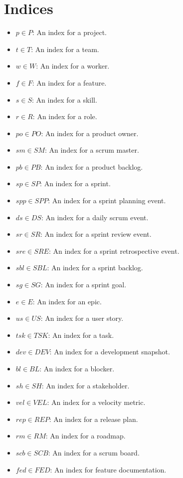 \documentclass{article}
\begin{document}
\section{Indices}
\begin{itemize}
    \item $p \in P$: An index for a project.
    \item $t \in T$: An index for a team.
    \item $w \in W$: An index for a worker.
    \item $f \in F$: An index for a feature.
    \item $s \in S$: An index for a skill.
    \item $r \in R$: An index for a role.
    \item $po \in PO$: An index for a product owner.
    \item $sm \in SM$: An index for a scrum master.
    \item $pb \in PB$: An index for a product backlog.
    \item $sp \in SP$: An index for a sprint.
    \item $spp \in SPP$: An index for a sprint planning event.
    \item $ds \in DS$: An index for a daily scrum event.
    \item $sr \in SR$: An index for a sprint review event.
    \item $sre \in SRE$: An index for a sprint retrospective event.
    \item $sbl \in SBL$: An index for a sprint backlog.
    \item $sg \in SG$: An index for a sprint goal.
    \item $e \in E$: An index for an epic.
    \item $us \in US$: An index for a user story.
    \item $tsk \in TSK$: An index for a task.
    \item $dev \in DEV$: An index for a development snapshot.
    \item $bl \in BL$: An index for a blocker.
    \item $sh \in SH$: An index for a stakeholder.
    \item $vel \in VEL$: An index for a velocity metric.
    \item $rep \in REP$: An index for a release plan.
    \item $rm \in RM$: An index for a roadmap.
    \item $scb \in SCB$: An index for a scrum board.
    \item $fed \in FED$: An index for feature documentation.
\end{itemize}
\end{document}
